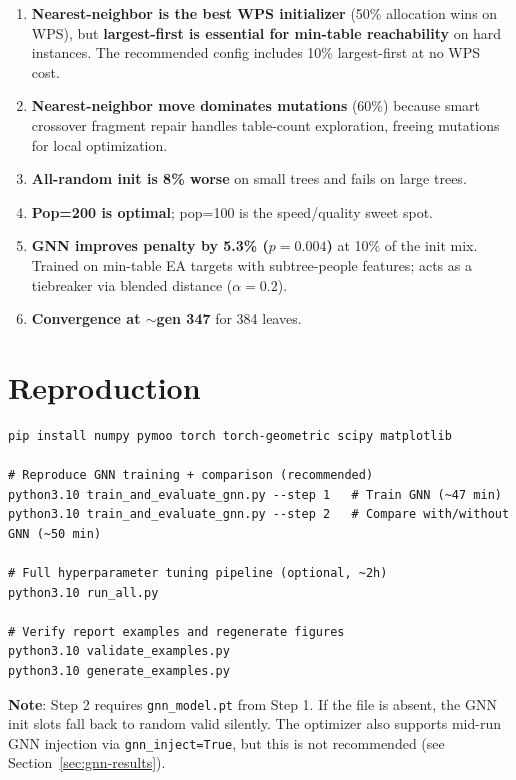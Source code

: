 \documentclass[11pt,a4paper]{article}
\begin{document}
\begin{enumerate}
\item \textbf{Nearest-neighbor is the best WPS initializer} (50\% allocation wins on WPS), but \textbf{largest-first is essential for min-table reachability} on hard instances.  The recommended config includes 10\% largest-first at no WPS cost.
\item \textbf{Nearest-neighbor move dominates mutations} (60\%) because smart crossover fragment repair handles table-count exploration, freeing mutations for local optimization.
\item \textbf{All-random init is 8\% worse} on small trees and fails on large trees.
\item \textbf{Pop=200 is optimal}; pop=100 is the speed/quality sweet spot.
\item \textbf{GNN improves penalty by 5.3\% ($p=0.004$)} at 10\% of the init mix.  Trained on min-table EA targets with subtree-people features; acts as a tiebreaker via blended distance ($\alpha=0.2$).
\item \textbf{Convergence at $\sim$gen 347} for 384 leaves.
\end{enumerate}

\appendix
\section{Reproduction}

\begin{lstlisting}
pip install numpy pymoo torch torch-geometric scipy matplotlib

# Reproduce GNN training + comparison (recommended)
python3.10 train_and_evaluate_gnn.py --step 1   # Train GNN (~47 min)
python3.10 train_and_evaluate_gnn.py --step 2   # Compare with/without GNN (~50 min)

# Full hyperparameter tuning pipeline (optional, ~2h)
python3.10 run_all.py

# Verify report examples and regenerate figures
python3.10 validate_examples.py
python3.10 generate_examples.py
\end{lstlisting}

\textbf{Note}: Step 2 requires \texttt{gnn\_model.pt} from Step 1.  If the file is absent, the GNN init slots fall back to random valid silently.  The optimizer also supports mid-run GNN injection via \texttt{gnn\_inject=True}, but this is not recommended (see Section~\ref{sec:gnn-results}).
\end{document}
